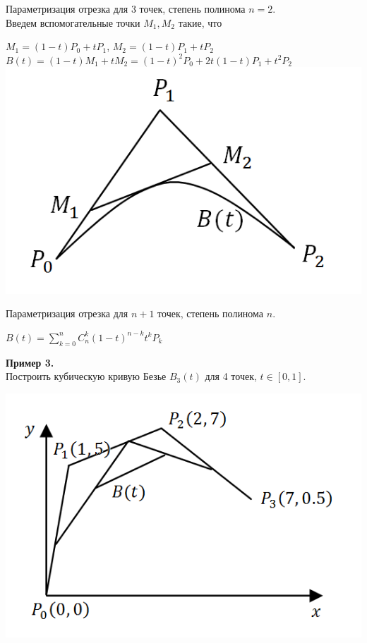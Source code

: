 \documentclass[12pt]{article}
\theoremstyle{definition}
\numberwithin{equation}{section}
\begin{document}
Параметризация отрезка для 3 точек, степень полинома $n = 2$.\\
Введем вспомогательные точки $M_1, M_2$ такие, что \begin{center}$M_1 = (1-t)P_0+tP_1$, $M_2 = (1-t)P_1+tP_2$\\
$B(t) = (1-t)M_1+tM_2 = (1-t)^2P_0+2t(1-t)P_1+t^2P_2$\\
\includegraphics[scale=0.5]{l3_8.png}\end{center}
Параметризация отрезка для $n+1$ точек, степень полинома $n$.
\begin{center}$B(t) = \sum\limits_{k=0}^n C_n^k (1-t)^{n-k}t^kP_k$\end{center}
\noindent \textbf{Пример 3.}\\
Построить кубическую кривую Безье $B_3(t)$ для 4 точек, $t\in [0, 1]$.\begin{center}
\includegraphics[scale=0.7]{l3_9.png}\end{center}
\end{document}
